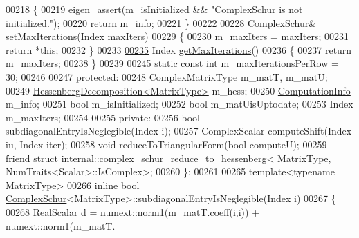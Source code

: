 \begin{DoxyCode}
00218 \textcolor{keyword}{    }\{
00219       eigen\_assert(m\_isInitialized && \textcolor{stringliteral}{"ComplexSchur is not initialized."});
00220       \textcolor{keywordflow}{return} m\_info;
00221     \}
00222 
\hyperlink{group___eigenvalues___module_a6ca227fbd5387f3a625351354b8eec44}{00228}     \hyperlink{group___eigenvalues___module_class_eigen_1_1_complex_schur}{ComplexSchur}& \hyperlink{group___eigenvalues___module_a6ca227fbd5387f3a625351354b8eec44}{setMaxIterations}(Index maxIters)
00229     \{
00230       m\_maxIters = maxIters;
00231       \textcolor{keywordflow}{return} *\textcolor{keyword}{this};
00232     \}
00233 
\hyperlink{group___eigenvalues___module_a2fc0b7bc409a49e7cdb7b6edcfff26eb}{00235}     Index \hyperlink{group___eigenvalues___module_a2fc0b7bc409a49e7cdb7b6edcfff26eb}{getMaxIterations}()
00236     \{
00237       \textcolor{keywordflow}{return} m\_maxIters;
00238     \}
00239 
00245     \textcolor{keyword}{static} \textcolor{keyword}{const} \textcolor{keywordtype}{int} m\_maxIterationsPerRow = 30;
00246 
00247   \textcolor{keyword}{protected}:
00248     ComplexMatrixType m\_matT, m\_matU;
00249     \hyperlink{group___eigenvalues___module}{HessenbergDecomposition<MatrixType>} m\_hess;
00250     \hyperlink{group__enums_ga85fad7b87587764e5cf6b513a9e0ee5e}{ComputationInfo} m\_info;
00251     \textcolor{keywordtype}{bool} m\_isInitialized;
00252     \textcolor{keywordtype}{bool} m\_matUisUptodate;
00253     Index m\_maxIters;
00254 
00255   \textcolor{keyword}{private}:  
00256     \textcolor{keywordtype}{bool} subdiagonalEntryIsNeglegible(Index i);
00257     ComplexScalar computeShift(Index iu, Index iter);
00258     \textcolor{keywordtype}{void} reduceToTriangularForm(\textcolor{keywordtype}{bool} computeU);
00259     \textcolor{keyword}{friend} \textcolor{keyword}{struct }\hyperlink{struct_eigen_1_1internal_1_1complex__schur__reduce__to__hessenberg}{internal::complex\_schur\_reduce\_to\_hessenberg}<
      MatrixType, NumTraits<Scalar>::IsComplex>;
00260 \};
00261 
00265 template<typename MatrixType>
00266 inline bool \hyperlink{group___eigenvalues___module_class_eigen_1_1_complex_schur}{ComplexSchur}<MatrixType>::subdiagonalEntryIsNeglegible(Index i)
00267 \{
00268   RealScalar d = numext::norm1(m\_matT.\hyperlink{class_eigen_1_1_plain_object_base_afbfc12954f16d21aedb7bd839f64a278}{coeff}(i,i)) + numext::norm1(m\_matT.

\end{DoxyCode}
